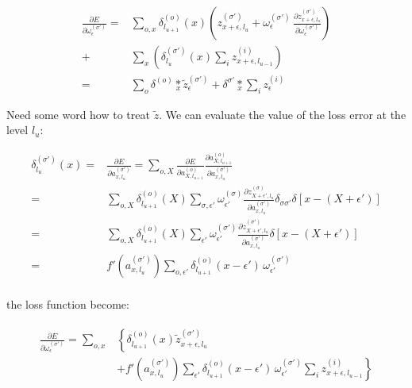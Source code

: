 \documentclass[final, paper=letter,5p,times,twocolumn]{elsarticle}
\begin{document}
\begin{equation*}  
\begin{split}
  \frac{\partial E}{\partial \omega_{\epsilon}^{(\sigma')}} = & \sum_{o,x} \delta_{l_{u+1}}^{(o)}(x)  \left( z_{x+\epsilon, l_{u}}^{(\sigma')} + \omega_{\epsilon}^{(\sigma')} \, \frac{\partial z_{x+\epsilon,l_{u}}^{(\sigma')}}{\partial \omega_{\epsilon}^{(\sigma')} } \right) \\
  + & \sum_{x} \left( \delta_{l_{u}}^{(\sigma')}(x)  \sum_{i}  z_{x+\epsilon, l_{u-1}}^{(i)} \right) \\
  = & \sum_{o} \delta^{(o)} \underset{x}{*} \tilde{z}_{\epsilon}^{(\sigma')} + \delta^{\sigma'} \underset{x}{*} \sum_{i} z_{\epsilon}^{(i)}
\end{split}
\end{equation*}

Need some word how to treat $\tilde{z}$. 
We can evaluate the value of the loss error at the level $l_{u}$:

\begin{equation*}  
\begin{split}
  \delta_{l_{u}}^{(\sigma')}(x) = & \frac{\partial E}{\partial a_{x,l_{u}}^{(\sigma')}} = \sum_{o,X} \frac{\partial E}{\partial a_{X,l_{u+1}}^{(o)}} \frac{\partial a_{X,l_{u+1}}^{(o)}}{\partial a_{x,l_{u}}^{(\sigma')}} \\
  = & \sum_{o,X} \delta_{l_{u+1}}^{(o)}(X) \sum_{\sigma,\epsilon'} \omega_{\epsilon'}^{(\sigma)} \frac{\partial z_{X + \epsilon', l_{u}}^{(\sigma)}}{\partial a_{x,l_{u}}^{(\sigma')}} \delta_{\sigma \sigma'}\delta[x-(X+\epsilon')] \\
  = & \sum_{o,X} \delta_{l_{u+1}}^{(o)}(X) \sum_{\epsilon'} \omega_{\epsilon'}^{(\sigma')} \frac{\partial z_{X + \epsilon', l_{u}}^{(\sigma')}}{\partial a_{x,l_{u}}^{(\sigma')}} \delta[x-(X+\epsilon')] \\
  = & f'(a_{x,l_{u}}^{(\sigma')}) \sum_{o,\epsilon'} \delta_{l_{u+1}}^{(o)}(x-\epsilon') \, \omega_{\epsilon'}^{(\sigma')}  \\
\end{split}
\end{equation*}

the loss function become:

\begin{eqnarray*}  
\begin{array}{rl}
  \frac{\partial E}{\partial \omega_{\epsilon}^{(\sigma')}} = \sum_{o,x} & \left\{ \delta_{l_{u+1}}^{(o)}(x) \tilde{z}_{x+\epsilon, l_{u}}^{(\sigma')} \right. \\
  & +  \left. f'(a_{x,l_{u}}^{(\sigma')}) \sum_{\epsilon'} \delta_{l_{u+1}}^{(o)}(x-\epsilon') \, \omega_{\epsilon'}^{(\sigma')} \sum_{i}  z_{x+\epsilon, l_{u-1}}^{(i)} \right\}
\end{array}
\end{eqnarray*}
\end{document}
